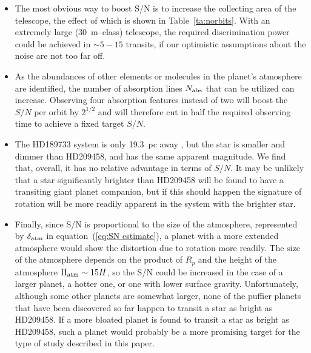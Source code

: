 \documentclass[12pt,preprint]{aastex}
\begin{document}
\begin{itemize}
\item The most obvious way to boost S/N is to increase the collecting area of
the telescope, the effect of which is shown in Table~\ref{ta:norbits}.  With an
extremely large (30~m--class) telescope, the required discrimination power
could be achieved in $\sim 5-15$ transits, if our optimistic assumptions about
the noise are not too far off.
\item As the abundances of other elements or molecules in the planet's
atmosphere are identified, the number of absorption lines $N_{\rm abs}$ that
can be utilized can increase.  Observing
four absorption features instead of two will boost the $S/N$ per orbit by
$2^{1/2}$ and will therefore cut in half the required observing time to
achieve a fixed target $S/N$.
\item The HD189733 system is only 19.3~pc away \citep{bouchy_et_al2005},
but the star is smaller and dimmer than HD209458, and has the same apparent
magnitude.  We find that, overall, it has no relative advantage in terms of
$S/N$.  It may be unlikely that a star significantly brighter than HD209458
will be found to have a transiting giant planet companion, but if this should
happen the signature of rotation will be more readily apparent in the system
with the brighter star.
\item Finally, since S/N is proportional to the size of the atmosphere,
represented by $\delta_{\rm atm}$ in equation~(\ref{eq:SN estimate}), a planet
with a more extended atmosphere would show the distortion due to rotation more
readily.  The size of the atmosphere depends on the product of $R_p$ and the
height of the atmosphere $\Pi_{\rm atm} \sim 15 H$, so the S/N could be
increased in the case of a larger planet, a hotter one, or one with lower
surface gravity.  Unfortunately, although some other planets are somewhat
larger, none of the puffier planets that have been discovered so far happen to
transit a star as bright as HD209458.  If a more bloated planet is found to
transit a star as bright as HD209458, such a planet would probably be a more
promising target for the type of study described in this paper.
\end{itemize}
\end{document}
